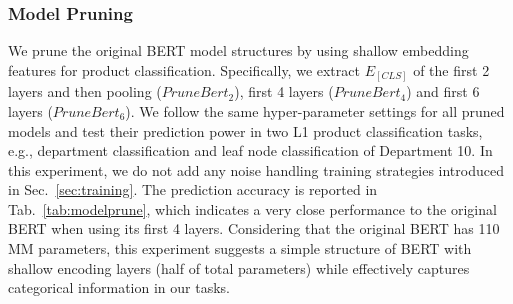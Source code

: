 \documentclass[11pt,dvipsnames]{article}
\begin{document}
\begin{table}[h]
    \centering
    \caption{Influence of bootstrap learning in L1 department classification. Improvement (+) or Downgrade (-). }
    \label{tab:bootstrap}
\end{table}



\subsubsection{Model Pruning}
We prune the original BERT model structures by using shallow embedding features for product classification. Specifically, we extract $E_{[CLS]}$ of the first 2 layers and then pooling ($PruneBert_2$), first 4 layers ($PruneBert_4$) and first 6 layers ($PruneBert_6$). We follow the same hyper-parameter settings for all pruned models and test their prediction power in two L1 product classification tasks, e.g., department classification and leaf node classification of Department 10. In this experiment, we do not add any noise handling training strategies introduced in Sec.~\ref{sec:training}. The prediction accuracy is reported in Tab.~\ref{tab:modelprune}, which indicates a very close performance to the original BERT when using its first 4 layers. Considering that the original BERT has 110 MM parameters, this experiment suggests a simple structure of BERT with shallow encoding layers (half of total parameters) while effectively captures categorical information in our tasks.    


\begin{table}[]
    \centering
    \caption{Changes of department/leaf prediction accuracy after model pruning.}
    \label{tab:modelprune}
\end{table}
\end{document}
